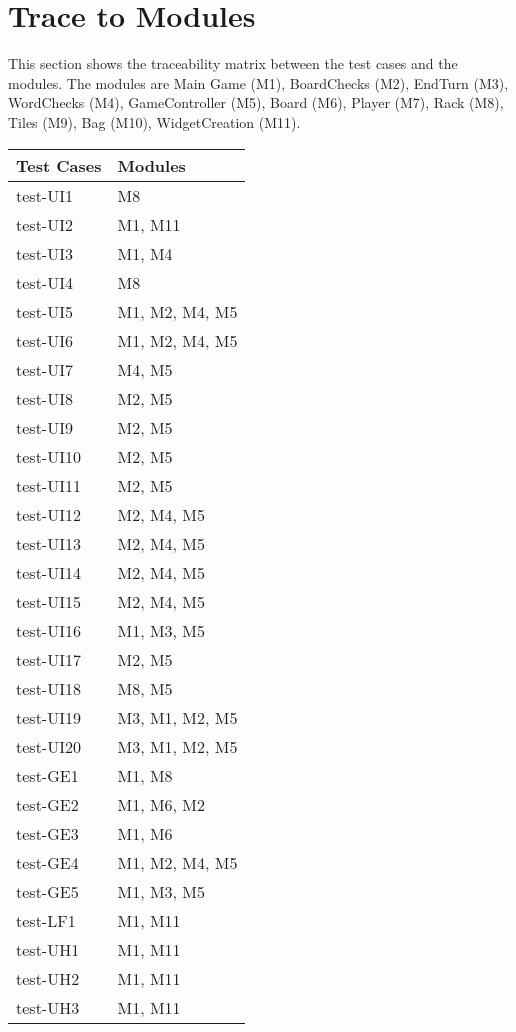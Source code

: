 \documentclass[12pt, titlepage]{article}
\begin{document}
\section{Trace to Modules}	

This section shows the traceability matrix between the test cases and the modules. The modules are Main Game (M1), BoardChecks (M2), EndTurn (M3), WordChecks (M4), GameController (M5), Board (M6), Player (M7), Rack (M8), Tiles (M9), Bag (M10), WidgetCreation (M11).

\begin{table}[H]
\centering
\begin{tabular}{p{} p{}}
\toprule
\textbf{Test Cases} & \textbf{Modules}\\
\midrule
test-UI1 & M8\\
test-UI2 & M1, M11\\
test-UI3 & M1, M4\\
test-UI4 & M8\\
test-UI5 & M1, M2, M4, M5\\
test-UI6 & M1, M2, M4, M5\\
test-UI7 & M4, M5\\
test-UI8 & M2, M5\\
test-UI9 & M2, M5\\
test-UI10 & M2, M5\\
test-UI11 & M2, M5\\
test-UI12 & M2, M4, M5\\
test-UI13 & M2, M4, M5\\
test-UI14 & M2, M4, M5\\
test-UI15 & M2, M4, M5\\
test-UI16 & M1, M3, M5\\
test-UI17 & M2, M5\\
test-UI18 & M8, M5\\
test-UI19 & M3, M1, M2, M5\\
test-UI20 & M3, M1, M2, M5\\
test-GE1 & M1, M8\\
test-GE2 & M1, M6, M2\\
test-GE3 & M1, M6\\
test-GE4 & M1, M2, M4, M5\\
test-GE5 & M1, M3, M5\\
test-LF1 & M1, M11\\
test-UH1 & M1, M11\\
test-UH2 & M1, M11\\
test-UH3 & M1, M11\\

\end{tabular}
\end{table}
\end{document}
